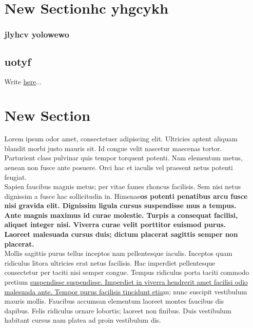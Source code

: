 \documentclass{article}
\begin{document}
\section{\textnormal{\textbf{New Sectionhc yhgcykh}}}
\subsubsection{\textnormal{jlyhcv  yolowewo}}
\subsection{\textnormal{uotyf}}
Write \uline{here}...
\section{\textnormal{\textbf{New} Section}}
Lorem ipsum odor amet, consectetuer adipiscing elit. Ultricies aptent aliquam blandit morbi justo mauris sit. Id congue velit nascetur maecenas tortor. Parturient class pulvinar quis tempor torquent potenti. Nam elementum metus, aenean non fusce ante posuere. Orci hac et iaculis vel praesent netus potenti feugiat.\\Sapien faucibus magnis metus; per vitae fames rhoncus facilisis. Sem nisi netus dignissim a fusce hac sollicitudin in. Himenae\textbf{os potenti penatibus arcu fusce nisi gravida elit. Dignissim ligula cursus suspendisse mus a tempus. Ante magnis maximus id curae molestie. Turpis a consequat facilisi, aliquet integer nisi. Viverra curae velit porttitor euismod purus. Laoreet malesuada cursus duis; dictum placerat sagittis semper non placerat.}\\Mollis sagittis purus tellus inceptos nam pellentesque iaculis. Inceptos quam ridiculus litora ultricies erat netus facilisis. Hac imperdiet pellentesque consectetur per taciti nisi semper congue. Tempus ridiculus porta taciti commodo pretium \uline{suspendisse suspendisse. Imperdiet in viverra hendrerit amet facilisi odio malesuada ante. Tempor purus facilisis tincidunt etia}m; nunc suscipit vestibulum mauris mollis. Faucibus accumsan elementum laoreet montes faucibus dis dapibus. Felis ridiculus ornare lobortis; laoreet non finibus. Duis vestibulum habitant cursus nam platea ad proin vestibulum dis.
\end{document}
